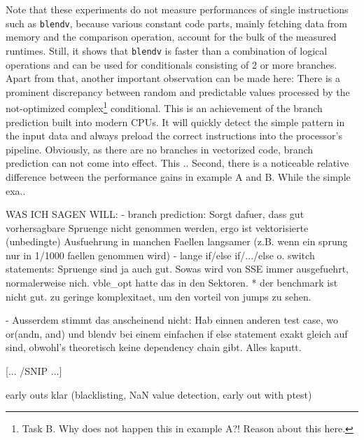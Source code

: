 Note that these experiments do not measure performances of single instructions such as \texttt{blendv}, because various constant code parts, mainly fetching data from memory and the comparison operation, account for the bulk of the measured runtimes. Still, it shows that \texttt{blendv} is faster than a combination of logical operations and can be used for conditionals consisting of 2 or more branches. Apart from that, another important observation can be made here: There is a prominent discrepancy between random and predictable values processed by the not-optimized complex\footnote{Task B. Why does not happen this in example A?! Reason about this here.} conditional. This is an achievement of the branch prediction built into modern CPUs. It will quickly detect the simple pattern in the input data and always preload the correct instructions into the processor's pipeline. Obviously, as there are no branches in vectorized code, branch prediction can not come into effect. This ..
Second, there is a noticeable relative difference between the performance gains in example A and B. While the simple exa..

WAS ICH SAGEN WILL:
- branch prediction: Sorgt dafuer, dass gut vorhersagbare Spruenge nicht genommen werden, ergo ist vektorisierte (unbedingte) Ausfuehrung in manchen Faellen langsamer (z.B. wenn ein sprung nur in 1/1000 faellen genommen wird)
- lange if/else if/.../else o. switch statements: Spruenge sind ja auch gut. Sowas wird von SSE immer ausgefuehrt, normalerweise nich. vble\_opt hatte das in den Sektoren.
* der benchmark ist nicht gut. zu geringe komplexitaet, um den vorteil von jumps zu sehen.

- Ausserdem stimmt das anscheinend nicht: Hab einnen anderen test case, wo or(andn, and) und blendv bei einem einfachen if else statement exakt gleich auf sind, obwohl's theoretisch keine dependency chain gibt. Alles kaputt.

[... /SNIP ...]

early outs klar (blacklisting, NaN value detection, early out with ptest)